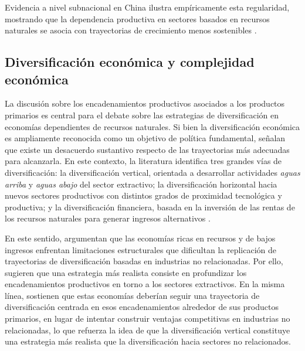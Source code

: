 \documentclass[../../TFM.tex]{subfiles}
\begin{document}
	Evidencia a nivel subnacional en China ilustra empíricamente esta regularidad, mostrando que la dependencia productiva en sectores basados en recursos naturales se asocia con trayectorias de crecimiento menos sostenibles \parencite{Wu2018}.
	
	\subsection{Diversificación económica y complejidad económica}
	\label{subsec:diversificacion-economica}
	
	La discusión sobre los encadenamientos productivos asociados a los productos primarios es central para el debate sobre las estrategias de diversificación en economías dependientes de recursos naturales. Si bien la diversificación económica es ampliamente reconocida como un objetivo de política fundamental, \textcite{Coniglio2018} señalan que existe un desacuerdo sustantivo respecto de las trayectorias más adecuadas para alcanzarla. En este contexto, la literatura identifica tres grandes vías de diversificación: la diversificación vertical, orientada a desarrollar actividades \textit{aguas arriba} y \textit{aguas abajo} del sector extractivo; la diversificación horizontal hacia nuevos sectores productivos con distintos grados de proximidad tecnológica y productiva; y la diversificación financiera, basada en la inversión de las rentas de los recursos naturales para generar ingresos alternativos \parencite{Lebdioui2019}.
	
	En este sentido, \textcite{Morris2013} argumentan que las economías ricas en recursos y de bajos ingresos enfrentan limitaciones estructurales que dificultan la replicación de trayectorias de diversificación basadas en industrias no relacionadas. Por ello, sugieren que una estrategia más realista consiste en profundizar los encadenamientos productivos en torno a los sectores extractivos. En la misma línea, \textcite{Lebdioui2019} sostienen que estas economías deberían seguir una trayectoria de diversificación centrada en esos encadenamientos alrededor de sus productos primarios, en lugar de intentar construir ventajas competitivas en industrias no relacionadas, lo que refuerza la idea de que la diversificación vertical constituye una estrategia más realista que la diversificación hacia sectores no relacionados.
	
\end{document}
